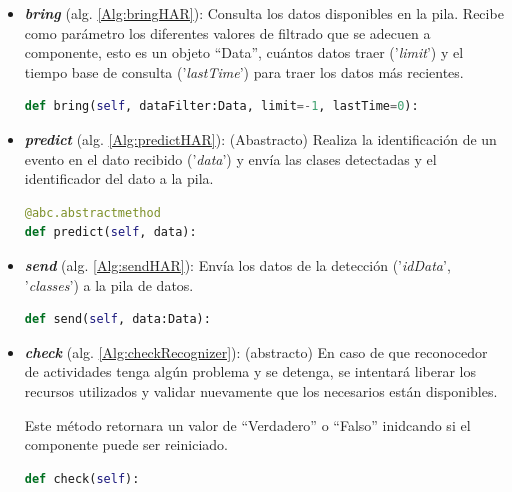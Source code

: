 \begin{itemize}
            \item \textbf{\textit{bring}} (alg. \ref{Alg:bringHAR}): 
            Consulta los datos disponibles en la pila. Recibe como parámetro los diferentes valores de filtrado que se adecuen a componente, esto es un objeto ``Data'', cuántos datos traer ('\textit{limit}') y el tiempo base de consulta ('\textit{lastTime}') para traer los datos más recientes.
            \begin{lstlisting}[language=Python, caption={Firma del método ``\textit{bring}'' de la clase ActivityRecognizer.}, label=Alg:bringHAR, numbers=none]
def bring(self, dataFilter:Data, limit=-1, lastTime=0):
            \end{lstlisting}
            
            \item \textbf{\textit{predict}} (alg. \ref{Alg:predictHAR}):
            (Abastracto) Realiza la identificación de un evento en el dato recibido ('\textit{data}') y envía las clases detectadas y el identificador del dato a la pila.
            \begin{lstlisting}[language=Python, caption={Firma del método ``\textit{predict}'' de la clase ActivityRecognizer.}, label=Alg:predictHAR, numbers=none]
@abc.abstractmethod
def predict(self, data):
            \end{lstlisting}
            
            \item \textbf{\textit{send}} (alg. \ref{Alg:sendHAR}):
            Envía los datos de la detección ('\textit{idData}', '\textit{classes}') a la pila de datos.
            \begin{lstlisting}[language=Python, caption={Firma del método ``\textit{send}'' de la clase ActivityRecognizer.}, label=Alg:sendHAR, numbers=none]
def send(self, data:Data):
            \end{lstlisting}
            
            \item \textbf{\textit{check}} (alg. \ref{Alg:checkRecognizer}): 
            (abstracto) En caso de que reconocedor de actividades tenga algún problema y se detenga, se intentará liberar los recursos utilizados y validar nuevamente que los necesarios están disponibles.
            
            Este método retornara un valor de ``Verdadero'' o ``Falso'' inidcando si el componente puede ser reiniciado.
            
            \begin{lstlisting}[language=Python, caption={Firma del método ``\textit{check}'' de la clase ActivityRecognizer.}, label=Alg:checkRecognizer, numbers=none]
def check(self):
            \end{lstlisting}
        
        \end{itemize}
        

